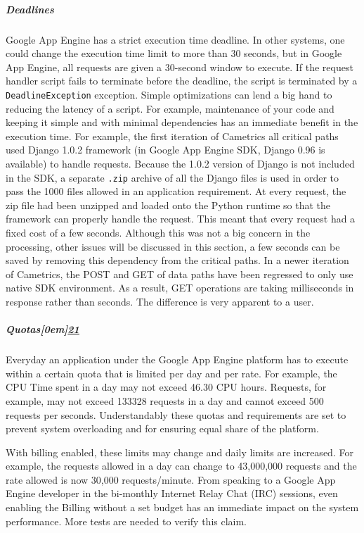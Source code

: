 \documentclass[10pt,a4paper,english]{article}
\begin{document}
\hypertarget{deadlines}{}
\subparagraph*{Deadlines}
\label{deadlines}

Google App Engine has a strict execution time deadline. In other systems, one could change the execution time limit to more than 30 seconds, but in Google App Engine, all requests are given a 30-second window to execute. If the request handler script fails to terminate before the deadline, the script is terminated by a \texttt{DeadlineException} exception. Simple optimizations can lend a big hand to reducing the latency of a script. For example, maintenance of your code and keeping it simple and with minimal dependencies has an immediate benefit in the execution time. For example, the first iteration of Cametrics all critical paths used Django 1.0.2 framework (in Google App Engine SDK, Django 0.96 is available) to handle requests. Because the 1.0.2 version of Django is not included in the SDK, a separate \texttt{.zip} archive of all the Django files is used in order to pass the 1000 files allowed in an application requirement. At every request, the zip file had been unzipped and loaded onto the Python runtime so that the framework can properly handle the request. This meant that every request had a fixed cost of a few seconds. Although this was not a big concern in the processing, other issues will be discussed in this section, a few seconds can be saved by removing this dependency from the critical paths. In a newer iteration of Cametrics, the POST and GET of data paths have been regressed to only use native SDK environment. As a result, GET operations are taking milliseconds in response rather than seconds. The difference is very apparent to a user.



\hypertarget{quotas}{}
\subparagraph*{Quotas\raisebox{.5em}[0em]{\scriptsize\hyperlink{id43}{21}}}
\label{quotas}

Everyday an application under the Google App Engine platform has to execute within a certain quota that is limited per day and per rate. For example, the CPU Time spent in a day may not exceed 46.30 CPU hours. Requests, for example, may not exceed 133328 requests in a day and cannot exceed 500 requests per seconds. Understandably these quotas and requirements are set to prevent system overloading and for ensuring equal share of the platform.

With billing enabled, these limits may change and daily limits are increased. For example, the requests allowed in a day can change to 43,000,000 requests and the rate allowed is now 30,000 requests/minute. From speaking to a Google App Engine developer in the bi-monthly Internet Relay Chat (IRC) sessions, even enabling the Billing without a set budget has an immediate impact on the system performance. More tests are needed to verify this claim.
\end{document}
